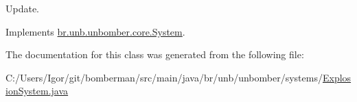 Update. 



Implements \hyperlink{interfacebr_1_1unb_1_1unbomber_1_1core_1_1_system_a6b1268f3fef77e2ce797eedc1b34eb44}{br.\+unb.\+unbomber.\+core.\+System}.



The documentation for this class was generated from the following file\+:\begin{DoxyCompactItemize}
\item 
C\+:/\+Users/\+Igor/git/bomberman/src/main/java/br/unb/unbomber/systems/\hyperlink{_explosion_system_8java}{Explosion\+System.\+java}\end{DoxyCompactItemize}
